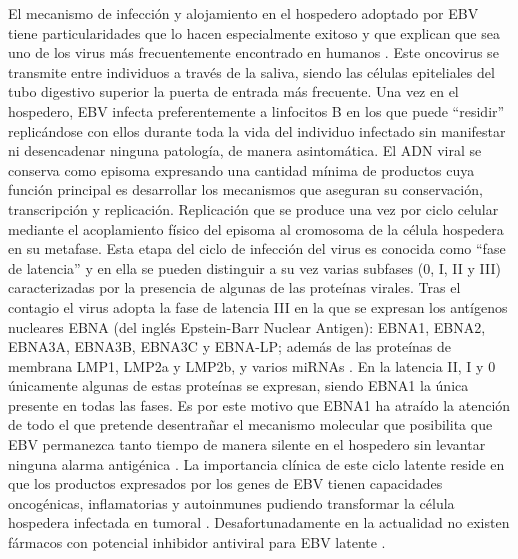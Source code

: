 \documentclass[12pt,letterpaper]{article} %
\begin{document}
El mecanismo de infección y alojamiento en el hospedero adoptado por EBV tiene
particularidades que lo hacen especialmente exitoso y que explican que sea uno
de los virus más frecuentemente encontrado en humanos
\cite{Lieberman2014,Gupta2014,Damania2015,Klein2015,Minarovits2017}. Este
oncovirus se transmite entre individuos a través de la saliva, siendo las
células epiteliales del tubo digestivo superior la puerta de entrada más
frecuente. Una vez en el hospedero, EBV infecta preferentemente a linfocitos B
en los que puede ``residir'' replicándose con ellos durante toda la vida del
individuo infectado sin manifestar ni desencadenar ninguna patología, de manera
asintomática. El ADN viral se conserva como episoma expresando una cantidad
mínima de productos cuya función principal es desarrollar los mecanismos que
aseguran su conservación, transcripción y replicación. Replicación que se
produce una vez por ciclo celular mediante el acoplamiento físico del episoma al
cromosoma de la célula hospedera en su metafase. Esta etapa del ciclo de
infección del virus es conocida como ``fase de latencia'' y en ella se pueden
distinguir a su vez varias subfases (0, I, II y III) caracterizadas por la
presencia de algunas de las proteínas virales. Tras el contagio el virus adopta
la fase de latencia III en la que se expresan los antígenos nucleares EBNA (del
inglés Epstein-Barr Nuclear Antigen): EBNA1, EBNA2, EBNA3A, EBNA3B, EBNA3C y
EBNA-LP; además de las proteínas de membrana LMP1, LMP2a y LMP2b, y varios
miRNAs \cite{Kang2015b}. En la latencia II, I y 0 únicamente algunas de estas
proteínas se expresan, siendo EBNA1 la única presente en todas las fases. Es por
este motivo que EBNA1 ha atraído la atención de todo el que pretende desentrañar
el mecanismo molecular que posibilita que EBV permanezca tanto tiempo de manera
silente en el hospedero sin levantar ninguna alarma antigénica
\cite{Israel2003,Jiang2017,Lima2013a,Daskalogianni2015,Noh2016b,Gianti2016,Kosowicz2017}.
La importancia clínica de este ciclo latente reside en que los productos
expresados por los genes de EBV tienen capacidades oncogénicas, inflamatorias y
autoinmunes pudiendo transformar la célula hospedera infectada en tumoral
\cite{Humme2003,Klein2015}. Desafortunadamente en la actualidad no existen
fármacos con potencial inhibidor antiviral para EBV latente \cite{Kempkes2015}.
\end{document}
